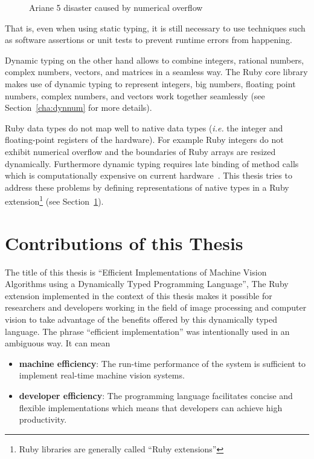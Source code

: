 \documentclass[12pt,a4paper,oneside,openright]{book}
\newcommand{\xtitle}{Efficient Implementations of Machine Vision Algorithms using a Dynamically Typed Programming Language}
\newcommand{\Eg}{For ex\-am\-ple }
\newcommand{\ie}{\emph{i.e.} }
\newcommand{\Ie}{That is, }
\newcommand{\sct}[1]{Section~\ref{cha:#1}}
\begin{document}
\begin{CJK}{UTF8}{}
\begin{figure}[htbp]
\begin{center}
     \caption{Ariane 5 disaster caused by numerical overflow\label{fig:ariane}}
   \end{center}
\end{figure}
\Ie even when using static typing, it is still necessary to use techniques such as software assertions or unit tests to prevent runtime errors from happening.

Dynamic typing on the other hand allows to combine integers, rational numbers, complex numbers, vectors, and matrices in a seamless way. The Ruby core library makes use of dynamic typing to represent integers, big numbers, floating point numbers, complex numbers, and vectors work together seamlessly (see \sct{dynnum} for more details).

Ruby data types do not map well to native data types (\ie the integer and floating-point registers of the hardware). \Eg Ruby integers do not exhibit numerical overflow and the boundaries of Ruby arrays are resized dynamically. Furthermore dynamic typing requires late binding of method calls which is computationally expensive on current hardware~\citep{RefWorks:484}. This thesis tries to address these problems by defining representations of native types in a Ruby extension\footnote{Ruby libraries are generally called ``Ruby extensions''} (see \sct{contrib}).

\section{Contributions of this Thesis}\label{cha:contrib}
The title of this thesis is ``\xtitle'', The Ruby extension implemented in the context of this thesis makes it possible for researchers and developers working in the field of image processing and computer vision to take advantage of the benefits offered by this dynamically typed language. The phrase ``efficient implementation'' was intentionally used in an ambiguous way. It can mean
\begin{itemize}
\item \textbf{machine efficiency}: The run-time performance of the system is sufficient to implement real-time machine vision systems.
\item \textbf{developer efficiency}: The programming language facilitates concise and flexible implementations which means that developers can achieve high productivity.
\end{itemize}


\end{CJK}
\end{document}
